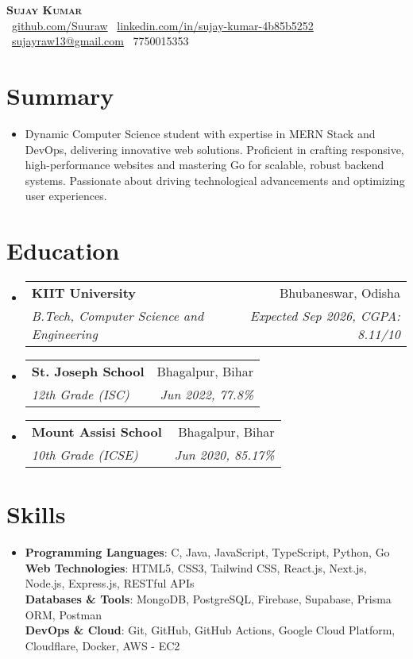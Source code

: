 \documentclass[letterpaper,11pt]{article}
\makeatletter
\newcommand{\resumeSubheading}[4]{
  \vspace{-4pt}\item
  \begin{tabular*}{0.98\textwidth}[t]{l@{\extracolsep{\fill}}r}
    \textbf{#1} & #2 \\
    \textit{\small#3} & \textit{\small #4} \\
  \end{tabular*}\vspace{-8pt}
}
\newcommand{\resumeSubHeadingListStart}{\begin{itemize}[leftmargin=0.1in, label={}]}
\newcommand{\resumeSubHeadingListEnd}{\end{itemize}\vspace{-8pt}}
\makeatother
\begin{document}
\begin{center}
  \textbf{\Huge \scshape Sujay Kumar} \\ \vspace{12pt}
  \small
  \vspace{10pt}
  \faGithub\ \href{https://github.com/Suuraw}{github.com/Suuraw} \quad
  \faLinkedin\ \href{https://linkedin.com/in/sujay-kumar-4b85b5252}{linkedin.com/in/sujay-kumar-4b85b5252} \quad
  \faEnvelope\ \href{mailto:sujayraw13@gmail.com}{sujayraw13@gmail.com} \quad
  \faPhone\ 7750015353
\end{center}
\vspace{-10pt}

\section{Summary}
\vspace{6pt}
\resumeSubHeadingListStart
  \item{Dynamic Computer Science student with expertise in MERN Stack and DevOps, delivering innovative web solutions. Proficient in crafting responsive, high-performance websites and mastering Go for scalable, robust backend systems. Passionate about driving technological advancements and optimizing user experiences.}
\resumeSubHeadingListEnd

\section{Education}
\vspace{6pt}
\resumeSubHeadingListStart
  \resumeSubheading{KIIT University}{Bhubaneswar, Odisha}{B.Tech, Computer Science and Engineering}{Expected Sep 2026, CGPA: 8.11/10}
  \resumeSubheading{St. Joseph School}{Bhagalpur, Bihar}{12th Grade (ISC)}{Jun 2022, 77.8\%}
  \resumeSubheading{Mount Assisi School}{Bhagalpur, Bihar}{10th Grade (ICSE)}{Jun 2020, 85.17\%}
\resumeSubHeadingListEnd

\section{Skills}
\vspace{6pt}
\resumeSubHeadingListStart
  \item{
    \textbf{Programming Languages}: C, Java, JavaScript, TypeScript, Python, Go \\ \vspace{2pt}
    \textbf{Web Technologies}: HTML5, CSS3, Tailwind CSS, React.js, Next.js, Node.js, Express.js, RESTful APIs \\ \vspace{2pt}
    \textbf{Databases \& Tools}: MongoDB, PostgreSQL, Firebase, Supabase, Prisma ORM, Postman \\  \vspace{2pt}
    \textbf{DevOps \& Cloud}: Git, GitHub, GitHub Actions, Google Cloud Platform, Cloudflare, Docker, AWS - EC2
  }
\resumeSubHeadingListEnd
\end{document}
